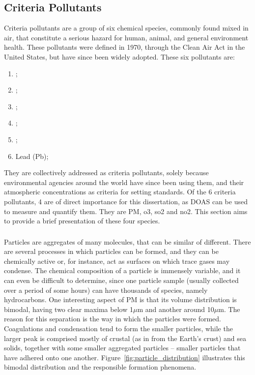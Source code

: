 \subsection{Criteria Pollutants}%
\label{sub:criteria_pollutants}

Criteria pollutants are a group of six chemical species, commonly found
mixed in air, that constitute a serious hazard for human, animal, and
general environment health. These pollutants were defined in 1970,
through the Clean Air Act in the United States, but have since been
widely adopted. These six pollutants are:
\begin{enumerate}
    \item {};
    \item {};
    \item {};
    \item {};
    \item {};
    \item Lead (Pb);
\end{enumerate}

They are collectively addressed as criteria pollutants, solely because
environmental agencies around the world have since been using them, and
their atmospheric concentrations as criteria for setting standards. Of
the 6 criteria pollutants, 4 are of direct importance for this
dissertation, as \gls{DOAS} can be used to measure and quantify them.
They are \gls{PM}, \gls{o3}, \gls{so2} and \gls{no2}. This section aims
to provide a brief presentation of these four species.

\subsubsection{}%
\label{ssub:pm}

Particles are aggregates of many molecules, that can be similar of
different. There are several processes in which particles can be formed,
and they can be chemically active or, for instance, act as surfaces on
which trace gases may condense. The chemical composition of a particle
is immensely variable, and it can even be difficult to determine, since
one particle sample (usually collected over a period of some hours) can
have thousands of species, namely hydrocarbons. One interesting aspect
of \gls{PM} is that its volume distribution is bimodal, having two clear
maxima below 1$\mu$m and another around 10$\mu$m. The reason for this
separation is the way in which the particles were formed. Coagulations
and condensation tend to form the smaller particles, while the larger
peak is comprised mostly of crustal (as in from the Earth's crust)
and sea solids, together with some smaller aggregated particles --
smaller particles that have adhered onto one another.
Figure~\ref{fig:particle_distribution} illustrates this bimodal
distribution and the responsible formation phenomena.

